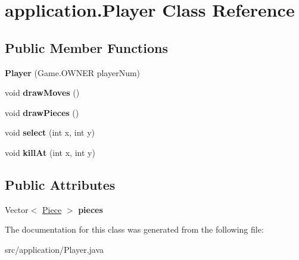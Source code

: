\hypertarget{classapplication_1_1_player}{\section{application.\+Player Class Reference}
\label{classapplication_1_1_player}
}
\subsection*{Public Member Functions}
\begin{DoxyCompactItemize}
\item 
\hypertarget{classapplication_1_1_player_a14ac1e2c788fb22e7e5be4e5e6bc1847}{{\bfseries Player} (Game.\+O\+W\+N\+E\+R player\+Num)}\label{classapplication_1_1_player_a14ac1e2c788fb22e7e5be4e5e6bc1847}

\item 
\hypertarget{classapplication_1_1_player_a0fd6b813c9a0ab1e9844d0c13d709a44}{void {\bfseries draw\+Moves} ()}\label{classapplication_1_1_player_a0fd6b813c9a0ab1e9844d0c13d709a44}

\item 
\hypertarget{classapplication_1_1_player_ad598f6c101732c33ced27c1ec23b7080}{void {\bfseries draw\+Pieces} ()}\label{classapplication_1_1_player_ad598f6c101732c33ced27c1ec23b7080}

\item 
\hypertarget{classapplication_1_1_player_abc096ccded0197ea0a5a87e09b55507e}{void {\bfseries select} (int x, int y)}\label{classapplication_1_1_player_abc096ccded0197ea0a5a87e09b55507e}

\item 
\hypertarget{classapplication_1_1_player_a82638976ae19fce3c6e03b589938abaa}{void {\bfseries kill\+At} (int x, int y)}\label{classapplication_1_1_player_a82638976ae19fce3c6e03b589938abaa}

\end{DoxyCompactItemize}
\subsection*{Public Attributes}
\begin{DoxyCompactItemize}
\item 
\hypertarget{classapplication_1_1_player_ade2a529ac843368e351446cde7e6f76b}{Vector$<$ \hyperlink{classapplication_1_1_piece}{Piece} $>$ {\bfseries pieces}}\label{classapplication_1_1_player_ade2a529ac843368e351446cde7e6f76b}

\end{DoxyCompactItemize}


The documentation for this class was generated from the following file\+:\begin{DoxyCompactItemize}
\item 
src/application/Player.\+java\end{DoxyCompactItemize}
